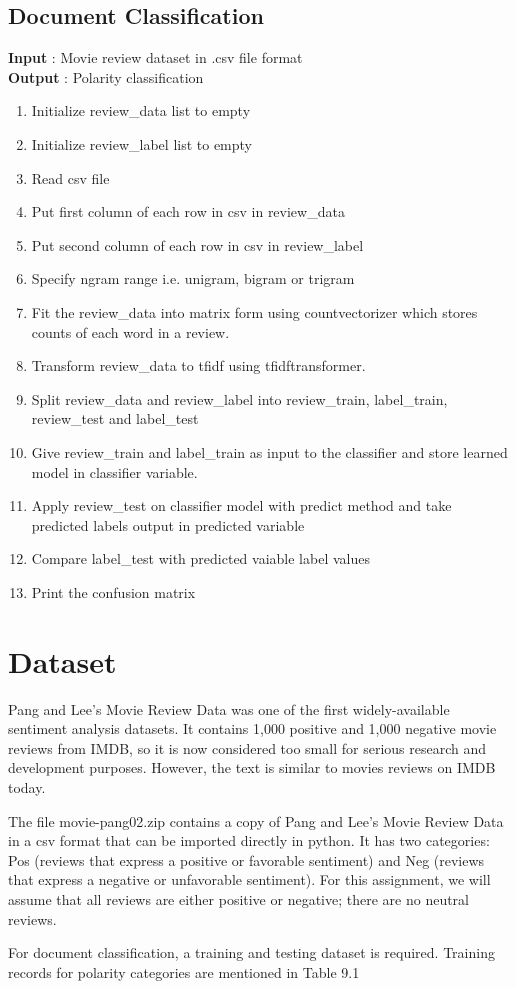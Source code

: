 \documentclass[oneside,a4paper,12pt]{pictreport}
\begin{document}
\subsection{Document Classification}

\textbf{Input} : Movie review dataset in .csv file format \\
\textbf{Output} : Polarity classification \\

\begin{enumerate}
\item Initialize review\_data list to empty
\item Initialize review\_label list to empty
\item Read csv file
\item Put first column of each row in csv in review\_data
\item Put second column of each row in csv in review\_label
\item Specify ngram range i.e. unigram, bigram or trigram
\item Fit the review\_data into matrix form using countvectorizer
which stores counts of each word in a review.
\item Transform review\_data to tfidf using tfidftransformer.
\item Split review\_data and review\_label into review\_train, 
label\_train, review\_test and label\_test
\item Give review\_train and label\_train as input to the classifier
and store learned model in classifier variable.
\item Apply review\_test on classifier model with predict method
and take predicted labels output in predicted variable
\item Compare label\_test with predicted vaiable label values
\item Print the confusion matrix
\end{enumerate}\section{Dataset}
\hspace{1.1cm} Pang and Lee's Movie Review Data was one of the first widely-available sentiment analysis datasets. It contains 1,000 positive and 1,000 negative movie reviews from IMDB, so it is now considered too small for serious research and development purposes. However, the text is similar to movies reviews on IMDB today.

\par The file movie-pang02.zip contains a copy of Pang and Lee's Movie Review Data in a csv format that can be imported directly in python. It has two categories: Pos (reviews that express a positive or favorable sentiment) and Neg (reviews that express a negative or unfavorable sentiment). For this assignment, we will assume that all reviews are either positive or negative; there are no neutral reviews. 
\par For document classification, a training and testing dataset is required. Training records for polarity categories are mentioned in Table 9.1
\end{document}
